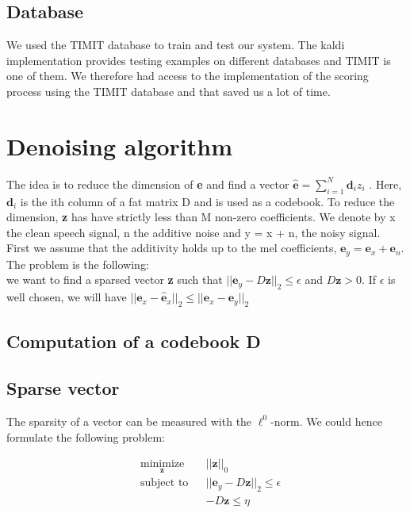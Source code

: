 \documentclass[a4paper]{report}
\newcommand{\ehat}{\hat{\textbf{e}}}
\newcommand{\ey}{\textbf{e}_y}
\newcommand{\ex}{\textbf{e}_x}
\newcommand{\en}{\textbf{e}_n}
\newcommand{\exhat}{ \hat{\textbf{e}}_x }
\begin{document}
\subsection{Database}
We used the TIMIT database to train and test our system. The kaldi implementation provides testing examples on different databases and TIMIT is one of them. We therefore had access to the implementation of the scoring process using the TIMIT database and that saved us a lot of time.

\section{Denoising algorithm}
The idea is to reduce the dimension of \textbf{e} and find a vector $\ehat = \sum_{i=1}^N\textbf{d}_iz_i$ . Here, $\textbf{d}_i$ is the ith column of a fat matrix D and is used as a codebook. To reduce the dimension, \textbf{z} has have strictly less than M non-zero coefficients.
We denote by x the clean speech signal, n the additive noise and y = x + n, the noisy signal. 
First we assume that the additivity holds up to the mel coefficients, $\ey= \ex + \en$.\\
The problem is the following:\\
we want to find a sparsed vector \textbf{z} such that $||\ey-D\textbf{z}||_2 \leq \epsilon$ and $D\mathbf{z} > 0$. If $\epsilon$ is well chosen, we will have $||\ex - \exhat||_2 \leq ||\ex - \ey||_2$

\subsection{Computation of a codebook D}

\subsection{Sparse vector}
The sparsity of a vector can be measured with the $\ell^0$-norm. We could hence formulate the following problem:

\begin{equation}
  \begin{aligned}
    & \underset{\mathbf{z}}{\text{minimize}}
    & & ||\mathbf{z}||_0 \\
    & \text{subject to}
    & & ||\ey -D\mathbf{z}||_2 \leq \epsilon\\
    &&& -D\mathbf{z} \leq \eta
  \end{aligned}
\label{l0}
\end{equation}
\end{document}
